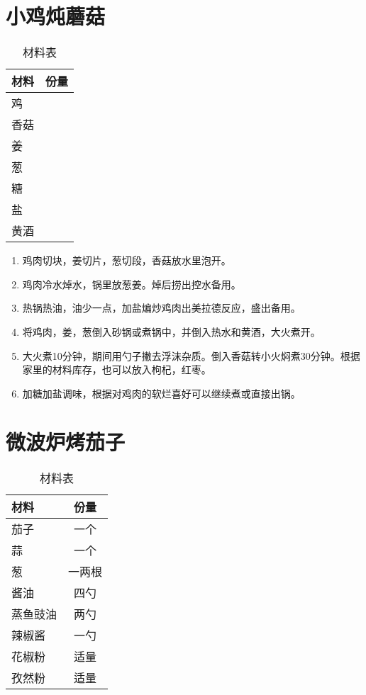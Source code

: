 \section{小鸡炖蘑菇}

\begin{table}[H]
    \centering
    \begin{tabular}{|l||c|}\hline
     \textbf{材料}    &  \textbf{份量}\\ \hline\hline
    鸡    &   \\ \hline
    香菇    &  \\ \hline
    姜     &  \\ \hline
    葱     &  \\ \hline
    糖     & \\ \hline
    盐     &  \\ \hline
    黄酒     &  \\ \hline
    \end{tabular}
    \caption{材料表}
\end{table}

\begin{enumerate}
    \item 鸡肉切块，姜切片，葱切段，香菇放水里泡开。
 
    \item 鸡肉冷水焯水，锅里放葱姜。焯后捞出控水备用。
     
    \item 热锅热油，油少一点，加盐煸炒鸡肉出美拉德反应，盛出备用。
  
    \item 将鸡肉，姜，葱倒入砂锅或煮锅中，并倒入热水和黄酒，大火煮开。
    
    \item 大火煮10分钟，期间用勺子撇去浮沫杂质。倒入香菇转小火焖煮30分钟。根据家里的材料库存，也可以放入枸杞，红枣。
    
    \item 加糖加盐调味，根据对鸡肉的软烂喜好可以继续煮或直接出锅。
\end{enumerate}


\section{微波炉烤茄子}

\begin{table}[H]
    \centering
    \begin{tabular}{|l||c|}\hline
     \textbf{材料}    &  \textbf{份量}\\ \hline\hline
    茄子    &  一个 \\ \hline
    蒜     &  一个 \\ \hline
    葱     &  一两根\\ \hline
    酱油   & 四勺\\ \hline
    蒸鱼豉油 & 两勺 \\ \hline
    辣椒酱 & 一勺 \\ \hline
    花椒粉 & 适量 \\ \hline
    孜然粉 & 适量 \\ \hline
    \end{tabular}
    \caption{材料表}
\end{table}

